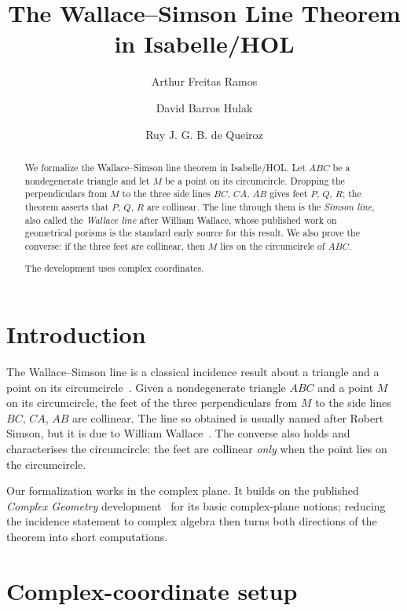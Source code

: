 \documentclass[11pt,a4paper]{article}
\begin{document}
\title{The Wallace--Simson Line Theorem in Isabelle/HOL}
\author{Arthur Freitas Ramos \and David Barros Hulak \and Ruy J. G. B. de Queiroz}
\maketitle

\begin{abstract}
We formalize the Wallace--Simson line theorem in Isabelle/HOL.  Let \(ABC\) be
a nondegenerate triangle and let \(M\) be a point on its circumcircle.  Dropping
the perpendiculars from \(M\) to the three side lines \(BC\), \(CA\), \(AB\)
gives feet \(P\), \(Q\), \(R\); the theorem asserts that \(P\), \(Q\), \(R\) are
collinear.  The line through them is the \emph{Simson line}, also called the
\emph{Wallace line} after William Wallace, whose published work on geometrical
porisms is the standard early source for this result.  We also prove the
converse: if the three feet are collinear, then \(M\) lies on the circumcircle
of \(ABC\).

The development uses complex coordinates.
\end{abstract}

\tableofcontents

\section{Introduction}

The Wallace--Simson line is a classical incidence result about a triangle and a
point on its circumcircle~\cite{coxeter1967,johnson1929,wallace1798}.  Given a
nondegenerate triangle \(ABC\) and a point \(M\) on its circumcircle, the feet
of the three perpendiculars from \(M\) to the side lines \(BC\), \(CA\), \(AB\)
are collinear.  The line so obtained is usually named after Robert Simson, but
it is due to William Wallace~\cite{wallace1798}.  The converse also holds and
characterises the circumcircle: the feet are collinear \emph{only} when the
point lies on the circumcircle.

Our formalization works in the complex plane.  It builds on the published
\emph{Complex Geometry} development~\cite{Complex_Geometry-AFP} for its basic
complex-plane notions; reducing the incidence statement to complex algebra then
turns both directions of the theorem into short computations.

\section{Complex-coordinate setup}
\end{document}
